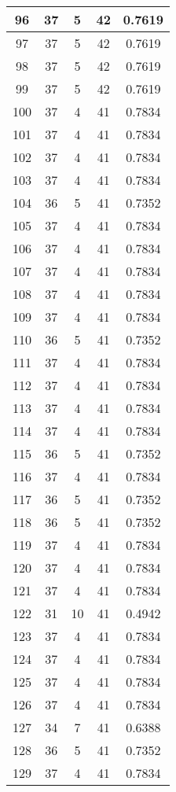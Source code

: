 \documentclass[letterpaper, 12pt]{article}
\begin{document}
\begin{longtable}{|c|c|c|c|c|}
\hline
96 & 37 & 5 & 42 & 0.7619 \\
\hline
97 & 37 & 5 & 42 & 0.7619 \\
\hline
98 & 37 & 5 & 42 & 0.7619 \\
\hline
99 & 37 & 5 & 42 & 0.7619 \\
\hline
100 & 37 & 4 & 41 & 0.7834 \\
\hline
101 & 37 & 4 & 41 & 0.7834 \\
\hline
102 & 37 & 4 & 41 & 0.7834 \\
\hline
103 & 37 & 4 & 41 & 0.7834 \\
\hline
104 & 36 & 5 & 41 & 0.7352 \\
\hline
105 & 37 & 4 & 41 & 0.7834 \\
\hline
106 & 37 & 4 & 41 & 0.7834 \\
\hline
107 & 37 & 4 & 41 & 0.7834 \\
\hline
108 & 37 & 4 & 41 & 0.7834 \\
\hline
109 & 37 & 4 & 41 & 0.7834 \\
\hline
110 & 36 & 5 & 41 & 0.7352 \\
\hline
111 & 37 & 4 & 41 & 0.7834 \\
\hline
112 & 37 & 4 & 41 & 0.7834 \\
\hline
113 & 37 & 4 & 41 & 0.7834 \\
\hline
114 & 37 & 4 & 41 & 0.7834 \\
\hline
115 & 36 & 5 & 41 & 0.7352 \\
\hline
116 & 37 & 4 & 41 & 0.7834 \\
\hline
117 & 36 & 5 & 41 & 0.7352 \\
\hline
118 & 36 & 5 & 41 & 0.7352 \\
\hline
119 & 37 & 4 & 41 & 0.7834 \\
\hline
120 & 37 & 4 & 41 & 0.7834 \\
\hline
121 & 37 & 4 & 41 & 0.7834 \\
\hline
122 & 31 & 10 & 41 & 0.4942 \\
\hline
123 & 37 & 4 & 41 & 0.7834 \\
\hline
124 & 37 & 4 & 41 & 0.7834 \\
\hline
125 & 37 & 4 & 41 & 0.7834 \\
\hline
126 & 37 & 4 & 41 & 0.7834 \\
\hline
127 & 34 & 7 & 41 & 0.6388 \\
\hline
128 & 36 & 5 & 41 & 0.7352 \\
\hline
129 & 37 & 4 & 41 & 0.7834 \\

\end{longtable}
\end{document}
